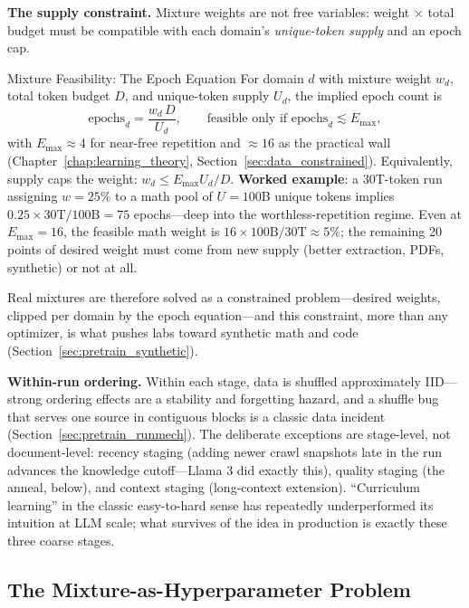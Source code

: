 \textbf{The supply constraint.} Mixture weights are not free variables: weight $\times$ total budget must be compatible with each domain's \textit{unique-token supply} and an epoch cap.

\begin{mathresult}{Mixture Feasibility: The Epoch Equation}
For domain $d$ with mixture weight $w_d$, total token budget $D$, and unique-token supply $U_d$, the implied epoch count is
\begin{equation}
\text{epochs}_d = \frac{w_d \, D}{U_d}, \qquad \text{feasible only if } \text{epochs}_d \lesssim E_{\max},
\end{equation}
with $E_{\max} \approx 4$ for near-free repetition and $\approx 16$ as the practical wall (Chapter~\ref{chap:learning_theory}, Section~\ref{sec:data_constrained}). Equivalently, supply caps the weight: $w_d \leq E_{\max} U_d / D$. \textbf{Worked example}: a 30T-token run assigning $w = 25\%$ to a math pool of $U = 100$B unique tokens implies $0.25 \times 30\text{T} / 100\text{B} = 75$ epochs---deep into the worthless-repetition regime. Even at $E_{\max} = 16$, the feasible math weight is $16 \times 100\text{B}/30\text{T} \approx 5\%$; the remaining 20 points of desired weight must come from new supply (better extraction, PDFs, synthetic) or not at all.
\end{mathresult}

Real mixtures are therefore solved as a constrained problem---desired weights, clipped per domain by the epoch equation---and this constraint, more than any optimizer, is what pushes labs toward synthetic math and code (Section~\ref{sec:pretrain_synthetic}).

\textbf{Within-run ordering.} Within each stage, data is shuffled approximately IID---strong ordering effects are a stability and forgetting hazard, and a shuffle bug that serves one source in contiguous blocks is a classic data incident (Section~\ref{sec:pretrain_runmech}). The deliberate exceptions are stage-level, not document-level: recency staging (adding newer crawl snapshots late in the run advances the knowledge cutoff---Llama 3 did exactly this), quality staging (the anneal, below), and context staging (long-context extension). ``Curriculum learning'' in the classic easy-to-hard sense has repeatedly underperformed its intuition at LLM scale; what survives of the idea in production is exactly these three coarse stages.

\subsection{The Mixture-as-Hyperparameter Problem}

